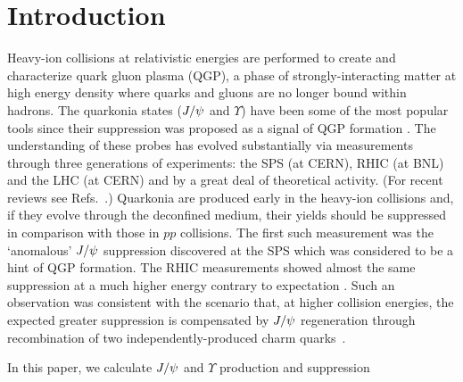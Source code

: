 \documentclass[aps,prc,preprint,superscriptaddress,showpacs,showkeys,amsmath]{revtex4-1}
\begin{document}
\maketitle


\section{Introduction}

Heavy-ion collisions at relativistic energies are performed to create and characterize 
quark gluon plasma (QGP), a phase of strongly-interacting matter at high energy density 
where quarks and gluons are no longer bound within hadrons.
The quarkonia states ($J/\psi$ and $\Upsilon$) have been some of the most popular tools 
since their suppression was proposed as a signal of QGP formation \cite{Matsui:1986dk}.
The understanding of these probes has evolved substantially via measurements 
through three generations of experiments: the SPS (at CERN), RHIC (at BNL) and the LHC (at CERN) 
and by a great deal of theoretical activity. (For recent reviews see 
Refs.~\cite{Schukraft:2013wba,Kluberg:2009wc,Brambilla:2010cs}.)
Quarkonia are produced early in the heavy-ion collisions and, if they evolve
through the deconfined medium, their yields should be suppressed in comparison with those in $pp$ collisions. 
The first such measurement was the `anomalous' $J/\psi$ suppression discovered at the SPS 
which was considered to be a hint of QGP formation. The RHIC measurements showed almost the 
same suppression at a much higher energy contrary to expectation \cite{Brambilla:2010cs,Adare:2011yf}. 
Such an observation was consistent with the scenario that, at higher collision energies, the 
expected greater suppression is compensated by  $J/\psi$ regeneration through recombination of two 
independently-produced charm quarks~\cite{Andronic:2003zv}. 

In this paper, we calculate $J/\psi$ and $\Upsilon$ production and
suppression 



\end{document}
